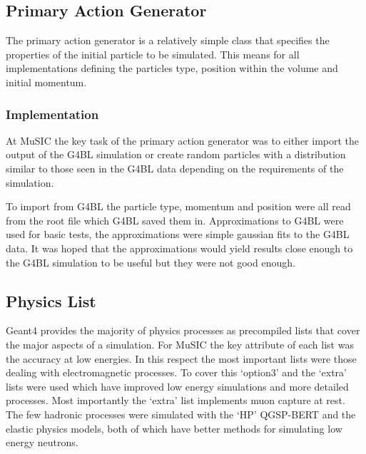 \subsection{Primary Action Generator} %
\label{sec:primary_action_generator}
The primary action generator is a relatively simple class that specifies the properties of the initial particle to be simulated. This means for all implementations defining the particles type, position within the volume and initial momentum. 

\subsubsection{Implementation} %
\label{sub:implementation}
At MuSIC the key task of the primary action generator was to either import the output of the G4BL simulation or create random particles with a distribution similar to those seen in the G4BL data depending on the requirements of the simulation. 

To import from G4BL the particle type, momentum and position were all read from the root file which G4BL saved them in. Approximations to G4BL were used for basic tests, the approximations were simple gaussian fits to the G4BL data. It was hoped that the approximations would yield results close enough to the G4BL simulation to be useful but they were not good enough.

\subsection{Physics List} %
\label{sec:physics_list}
Geant4 provides the majority of physics processes as precompiled lists that cover the major aspects of a simulation. For MuSIC the key attribute of each list was the accuracy at low energies. In this respect the most important lists were those dealing with electromagnetic processes. To cover this `option3' and the `extra' lists were used which have improved low energy simulations and more detailed processes. Most importantly the `extra' list implements muon capture at rest. The few hadronic processes were simulated with the `HP' QGSP-BERT and the elastic physics models, both of which have better methods for simulating low energy neutrons.

